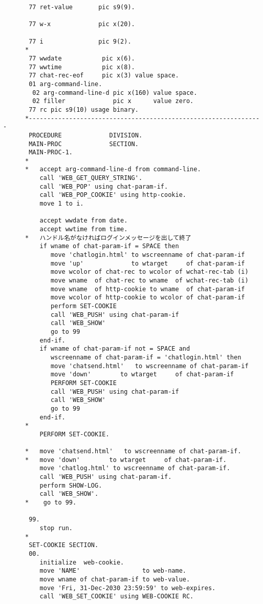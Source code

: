 {{\begin{verbatim}
       77 ret-value       pic s9(9).
      
       77 w-x             pic x(20).
      
       77 i               pic 9(2).
      *
       77 wwdate           pic x(6).
       77 wwtime           pic x(8).
       77 chat-rec-eof     pic x(3) value space.
       01 arg-command-line.
        02 arg-command-line-d pic x(160) value space.
        02 filler             pic x      value zero.
       77 rc pic s9(10) usage binary.
      *----------------------------------------------------------------
       PROCEDURE             DIVISION.
       MAIN-PROC             SECTION.
       MAIN-PROC-1.
      *
      *   accept arg-command-line-d from command-line.
          call 'WEB_GET_QUERY_STRING'.
          call 'WEB_POP' using chat-param-if.
          call 'WEB_POP_COOKIE' using http-cookie.
          move 1 to i.

          accept wwdate from date.
          accept wwtime from time.
      *   ハンドル名がなければログインメッセージを出して終了
          if wname of chat-param-if = SPACE then
             move 'chatlogin.html' to wscreenname of chat-param-if
             move 'up'             to wtarget     of chat-param-if
             move wcolor of chat-rec to wcolor of wchat-rec-tab (i)
             move wname  of chat-rec to wname  of wchat-rec-tab (i)
             move wname  of http-cookie to wname  of chat-param-if
             move wcolor of http-cookie to wcolor of chat-param-if
             perform SET-COOKIE
             call 'WEB_PUSH' using chat-param-if
             call 'WEB_SHOW'
             go to 99
          end-if.
          if wname of chat-param-if not = SPACE and
             wscreenname of chat-param-if = 'chatlogin.html' then
             move 'chatsend.html'   to wscreenname of chat-param-if
             move 'down'        to wtarget     of chat-param-if
             PERFORM SET-COOKIE
             call 'WEB_PUSH' using chat-param-if
             call 'WEB_SHOW'
             go to 99
          end-if.
      *
          PERFORM SET-COOKIE.

      *   move 'chatsend.html'   to wscreenname of chat-param-if.
      *   move 'down'        to wtarget     of chat-param-if.
          move 'chatlog.html' to wscreenname of chat-param-if.
          call 'WEB_PUSH' using chat-param-if.
          perform SHOW-LOG.
          call 'WEB_SHOW'.
      *    go to 99.          
      
       99.
          stop run.
      *
       SET-COOKIE SECTION.
       00.
          initialize  web-cookie.
          move 'NAME'                 to web-name.
          move wname of chat-param-if to web-value.
          move 'Fri, 31-Dec-2030 23:59:59' to web-expires.
          call 'WEB_SET_COOKIE' using WEB-COOKIE RC.


\end{verbatim}}}
